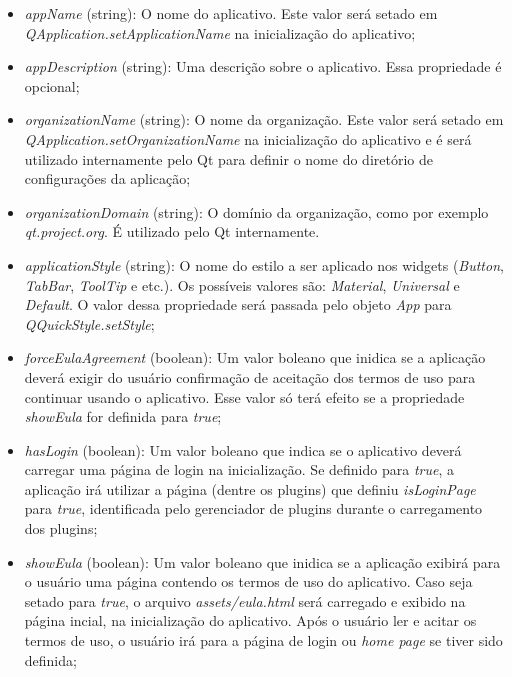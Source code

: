 \begin{itemize}
	\item \textit{appName} (string): O nome do aplicativo. Este valor será setado em \textit{QApplication.setApplicationName} na inicialização do aplicativo;

	\item \textit{appDescription} (string): Uma descrição sobre o aplicativo. Essa propriedade é opcional;

	\item \textit{organizationName} (string): O nome da organização. Este valor será setado em \textit{QApplication.setOrganizationName} na inicialização do aplicativo e é será utilizado internamente pelo Qt para definir o nome do diretório de configurações da aplicação;

	\item \textit{organizationDomain} (string): O domínio da organização, como por exemplo \textit{qt.project.org}. É utilizado pelo Qt internamente.

	\item \textit{applicationStyle} (string): O nome do estilo a ser aplicado nos widgets (\textit{Button}, \textit{TabBar}, \textit{ToolTip} e etc.). Os possíveis valores são: \textit{Material}, \textit{Universal} e \textit{Default}. O valor dessa propriedade será passada pelo objeto \textit{App} para \textit{QQuickStyle.setStyle};

	\item \textit{forceEulaAgreement} (boolean): Um valor boleano que inidica se a aplicação deverá exigir do usuário confirmação de aceitação dos termos de uso para continuar usando o aplicativo. Esse valor só terá efeito se a propriedade \textit{showEula} for definida para \textit{true};

	\item \textit{hasLogin} (boolean): Um valor boleano que indica se o aplicativo deverá carregar uma página de login na inicialização. Se definido para \textit{true}, a aplicação irá utilizar a página (dentre os plugins) que definiu \textit{isLoginPage} para \textit{true}, identificada pelo gerenciador de plugins durante o carregamento dos plugins;

	\item \textit{showEula} (boolean): Um valor boleano que inidica se a aplicação exibirá para o usuário uma página contendo os termos de uso do aplicativo. Caso seja setado para \textit{true}, o arquivo \textit{assets/eula.html} será carregado e exibido na página incial, na inicialização do aplicativo. Após o usuário ler e acitar os termos de uso, o usuário irá para a página de login ou \textit{home page} se tiver sido definida;


\end{itemize}
